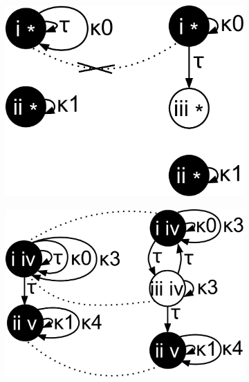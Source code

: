 
\begin{figure}[hbt]
  \hfill
  \begin{subfigure}[b]{102pt}
    \centering
    \includegraphics[scale=0.2]{lts-transformation/figs/subsets-ltss-left}
    \caption{}
    \label{fig:lts-transformation:subsets-ltss:left}
  \end{subfigure}
  \hfill
  \begin{subfigure}[b]{106pt}
    \centering
    \includegraphics[scale=0.2]{lts-transformation/figs/subsets-ltss-middle}

\end{subfigure}
\end{figure}
